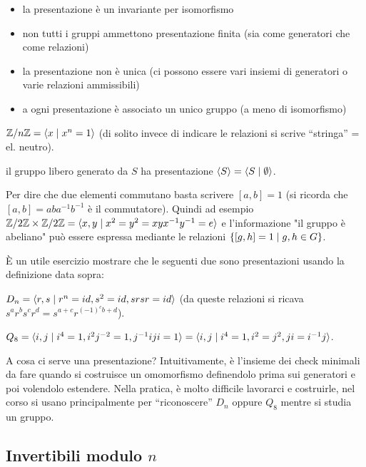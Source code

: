 \begin{itemize}
    \item la presentazione è un invariante per isomorfismo
    \item non tutti i gruppi ammettono presentazione finita (sia come generatori che come relazioni)
    \item la presentazione non è unica (ci possono essere vari insiemi di generatori o varie relazioni ammissibili)
    \item a ogni presentazione è associato un unico gruppo (a meno di isomorfismo)
    \end{itemize}
\begin{example}
    $\mathbb{Z}/n\mathbb{Z} = \langle x \mid x^n = 1 \rangle$ (di solito invece di indicare le relazioni si scrive ``stringa'' = el. neutro).
\end{example}
\begin{example}
    il gruppo libero generato da $S$ ha presentazione $\langle S \rangle = \langle S \mid \emptyset \rangle$.
\end{example}
\begin{example}
    Per dire che due elementi commutano basta scrivere $[a,b] = 1$ (si ricorda che $[a,b] = aba^{-1}b^{-1}$ è il commutatore). Quindi ad esempio $\mathbb{Z}/2\mathbb{Z} \times \mathbb{Z}/2\mathbb{Z} = \langle x,y \mid x^2 = y^2 = xyx^{-1}y^{-1} = e \rangle$ e l'informazione "il gruppo è abeliano" può essere espressa mediante le relazioni $\left\{ [g,h] = 1 \mid g,h \in G \right\}$.
\end{example}
È un utile esercizio mostrare che le seguenti due sono presentazioni usando la definizione data sopra:
\begin{example}
    $D_n = \langle  r, s \mid r^n = id, s^2 = id, srsr = id  \rangle$ (da queste relazioni si ricava $s^ar^bs^cr^d = s^{a+c}r^{(-1)^cb+d}$).
\end{example}
\begin{example}
    $Q_8 = \langle i,j \mid i^4 = 1, i^2j^{-2} = 1, j^{-1}iji = 1 \rangle = \langle i,j \mid i^4 = 1, i^2 = j^2, ji = i^{-1}j \rangle$.
\end{example}
A cosa ci serve una presentazione? Intuitivamente, è l'insieme dei check minimali da fare quando si costruisce un omomorfismo definendolo prima sui generatori e poi volendolo estendere. Nella pratica, è molto difficile lavorarci e costruirle, nel corso si usano principalmente per ``riconoscere'' $D_n$ oppure $Q_8$ mentre si studia un gruppo. 


\subsection{Invertibili modulo $n$}

